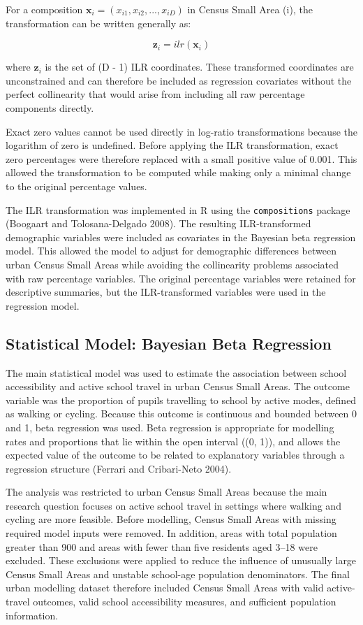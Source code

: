 \documentclass{article}
\begin{document}
For a composition \(\mathbf{x}_i = (x_{i1}, x_{i2}, ..., x_{iD})\) in
Census Small Area (i), the transformation can be written generally as:

\[
\mathbf{z}_i = ilr(\mathbf{x}_i)
\]

where \(\mathbf{z}_i\) is the set of (D - 1) ILR coordinates. These
transformed coordinates are unconstrained and can therefore be included
as regression covariates without the perfect collinearity that would
arise from including all raw percentage components directly.

Exact zero values cannot be used directly in log-ratio transformations
because the logarithm of zero is undefined. Before applying the ILR
transformation, exact zero percentages were therefore replaced with a
small positive value of 0.001. This allowed the transformation to be
computed while making only a minimal change to the original percentage
values.

The ILR transformation was implemented in R using the
\texttt{compositions} package (Boogaart and Tolosana-Delgado 2008). The
resulting ILR-transformed demographic variables were included as
covariates in the Bayesian beta regression model. This allowed the model
to adjust for demographic differences between urban Census Small Areas
while avoiding the collinearity problems associated with raw percentage
variables. The original percentage variables were retained for
descriptive summaries, but the ILR-transformed variables were used in
the regression model.

\subsection{Statistical Model: Bayesian Beta
Regression}\label{statistical-model-bayesian-beta-regression}

The main statistical model was used to estimate the association between
school accessibility and active school travel in urban Census Small
Areas. The outcome variable was the proportion of pupils travelling to
school by active modes, defined as walking or cycling. Because this
outcome is continuous and bounded between 0 and 1, beta regression was
used. Beta regression is appropriate for modelling rates and proportions
that lie within the open interval ((0, 1)), and allows the expected
value of the outcome to be related to explanatory variables through a
regression structure (Ferrari and Cribari-Neto 2004).

The analysis was restricted to urban Census Small Areas because the main
research question focuses on active school travel in settings where
walking and cycling are more feasible. Before modelling, Census Small
Areas with missing required model inputs were removed. In addition,
areas with total population greater than 900 and areas with fewer than
five residents aged 3--18 were excluded. These exclusions were applied
to reduce the influence of unusually large Census Small Areas and
unstable school-age population denominators. The final urban modelling
dataset therefore included Census Small Areas with valid active-travel
outcomes, valid school accessibility measures, and sufficient population
information.
\end{document}
